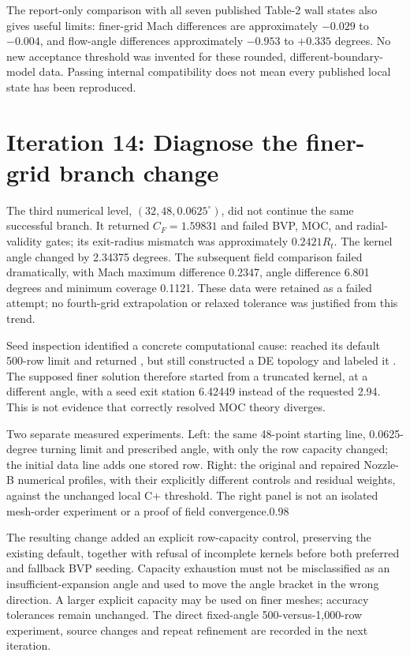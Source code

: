 The report-only comparison with all seven published Table-2 wall states
also gives useful limits: finer-grid Mach differences are approximately
$-0.029$ to $-0.004$, and flow-angle differences approximately
$-0.953$ to $+0.335$ degrees. No new acceptance threshold was invented
for these rounded, different-boundary-model data. Passing internal
compatibility does not mean every published local state has been reproduced.

\section{Iteration 14: Diagnose the finer-grid branch change}
The third numerical level, $(32,48,0.0625^\circ)$, did not continue the
same successful branch. It returned $C_F=1.59831$ and failed BVP, MOC,
and radial-validity gates; its exit-radius mismatch was approximately
$0.2421R_t$. The kernel angle changed by 2.34375 degrees. The subsequent
field comparison failed dramatically, with Mach maximum difference
0.2347, angle difference 6.801 degrees and minimum coverage 0.1121.
These data were retained as a failed attempt; no fourth-grid extrapolation
or relaxed tolerance was justified from this trend.

Seed inspection identified a concrete computational cause:
 reached its default 500-row limit and returned
, but  still constructed a
DE topology and labeled it . The supposed finer
solution therefore started from a truncated kernel, at a different angle,
with a seed exit station 6.42449 instead of the requested 2.94.
This is not evidence that correctly resolved MOC theory diverges.

{Two separate measured experiments. Left: the same 48-point starting line,
0.0625-degree turning limit and prescribed angle, with only the row capacity
changed; the initial data line adds one stored row. Right: the original and
repaired Nozzle-B numerical profiles, with their explicitly different controls
and residual weights, against the unchanged local C+ threshold. The right panel
is not an isolated mesh-order experiment or a proof of field convergence.}{0.98}

The resulting change added an explicit row-capacity control, preserving
the existing default, together with refusal of incomplete kernels before
both preferred and fallback BVP seeding. Capacity exhaustion must not be misclassified
as an insufficient-expansion angle and used to move the angle bracket in
the wrong direction. A larger explicit capacity may be used on finer
meshes; accuracy tolerances remain unchanged. The direct fixed-angle
500-versus-1,000-row experiment, source changes and repeat refinement
are recorded in the next iteration.

